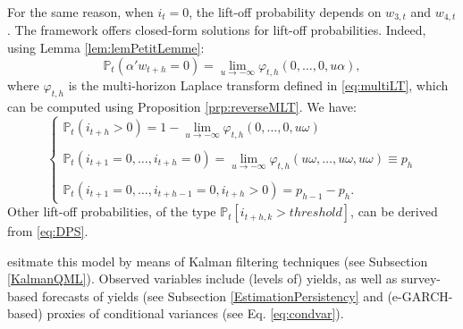 \documentclass[
  12pt,
]{book}
\theoremstyle{definition}
\theoremstyle{definition}
\theoremstyle{definition}
\theoremstyle{definition}
\theoremstyle{remark}
\begin{document}
For the same reason, when \(i_t=0\), the lift-off probability depends on \(w_{3,t}\) and \(w_{4,t}\). The framework offers closed-form solutions for lift-off probabilities. Indeed, using Lemma \ref{lem:lemPetitLemme}:
\[
\mathbb{P}_t(\alpha'w_{t+h}=0) = \lim_{u \rightarrow -\infty} \varphi_{t,h}(0,\dots,0,u\alpha),
\]
where \(\varphi_{t,h}\) is the multi-horizon Laplace transform defined in \eqref{eq:multiLT}, which can be computed using Proposition \ref{prp:reverseMLT}. We have:
\begin{equation}
\left\{
\begin{array}{l}
\mathbb{P}_t(i_{t+h}>0) = 1 - \lim_{u \rightarrow -\infty} \varphi_{t,h}(0,\dots,0,u\omega) \\ \\
\mathbb{P}_t(i_{t+1}=0,\dots,i_{t+h}=0) = \lim_{u \rightarrow -\infty} \varphi_{t,h}(u\omega,\dots,u\omega,u\omega) \equiv p_{h}\\ \\
\mathbb{P}_t(i_{t+1}=0,\dots,i_{t+h-1}=0,i_{t+h}>0) = p_{h-1} - p_h.
\end{array}
\right.
\end{equation}
Other lift-off probabilities, of the type \(\mathbb{P}_t[i_{t+h,k}>threshold]\), can be derived from \eqref{eq:DPS}.

\citet{zarg_2017} esitmate this model by means of Kalman filtering techniques (see Subsection \ref{KalmanQML}). Observed variables include (levels of) yields, as well as survey-based forecasts of yields (see Subsection \ref{EstimationPersistency} and (e-GARCH-based) proxies of conditional variances (see Eq. \eqref{eq:condvar}).
\end{document}
